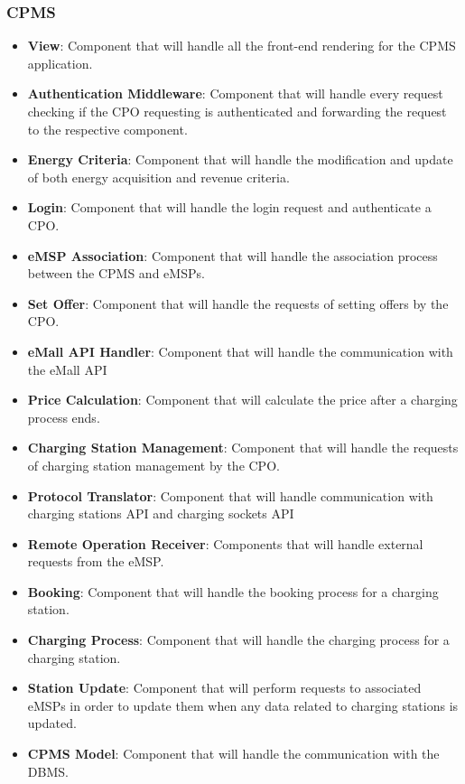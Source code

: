 \subsubsection{CPMS}
\begin{itemize}
    \item \textbf{View}: Component that will handle all the front-end rendering for the CPMS application.
    \item \textbf{Authentication Middleware}: Component that will handle every request checking if the CPO requesting is authenticated and forwarding the request to the respective component.
    \item \textbf{Energy Criteria}: Component that will handle the modification and update of both energy acquisition and revenue criteria.
    \item \textbf{Login}: Component that will handle the login request and authenticate a CPO.
    \item \textbf{eMSP Association}: Component that will handle the association process between the CPMS and eMSPs.
    \item \textbf{Set Offer}: Component that will handle the requests of setting offers by the CPO.
    \item \textbf{eMall API Handler}: Component that will handle the communication with the eMall API
    \item \textbf{Price Calculation}: Component that will calculate the price after a charging process ends.
    \item \textbf{Charging Station Management}: Component that will handle the requests of charging station management by the CPO.
    \item \textbf{Protocol Translator}: Component that will handle communication with charging stations API and charging sockets API
    \item \textbf{Remote Operation Receiver}: Components that will handle external requests from the eMSP.
    \item \textbf{Booking}: Component that will handle the booking process for a charging station.
    \item \textbf{Charging Process}: Component that will handle the charging process for a charging station.
    \item \textbf{Station Update}: Component that will perform requests to associated eMSPs in order to update them when any data related to charging stations is updated.
    \item \textbf{CPMS Model}: Component that will handle the communication with the DBMS.
\end{itemize}
\label{CPMSComponentView}
\newpage
